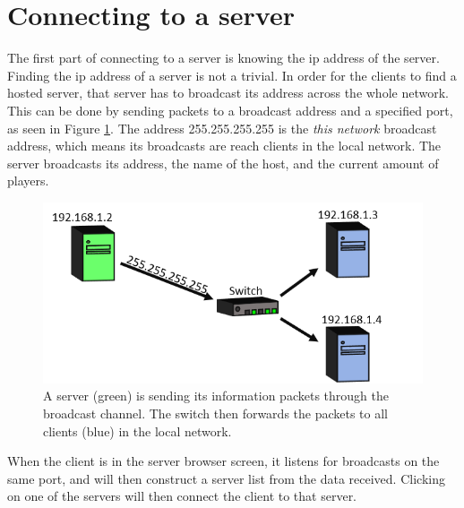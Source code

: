 \section{Connecting to a server}
The first part of connecting to a server is knowing the ip address of the server.
Finding the ip address of a server is not a trivial.
In order for the clients to find a hosted server, that server has to broadcast its address across the whole network.
This can be done by sending packets to a broadcast address and a specified port, as seen in Figure \ref{fig:broadcast}.
The address 255.255.255.255 is the \textit{this network} broadcast address, which means its broadcasts are reach clients in the local network.
The server broadcasts its address, the name of the host, and the current amount of players.

\begin{figure}[H]
\centering
\includegraphics[scale=1]{figures/network/broadcast}
\caption{A server (green) is sending its information packets through the broadcast channel. The switch then forwards the packets to all clients (blue) in the local network.}
\label{fig:broadcast}
\end{figure}

When the client is in the server browser screen, it listens for broadcasts on the same port, and will then construct a server list from the data received.
Clicking on one of the servers will then connect the client to that server.